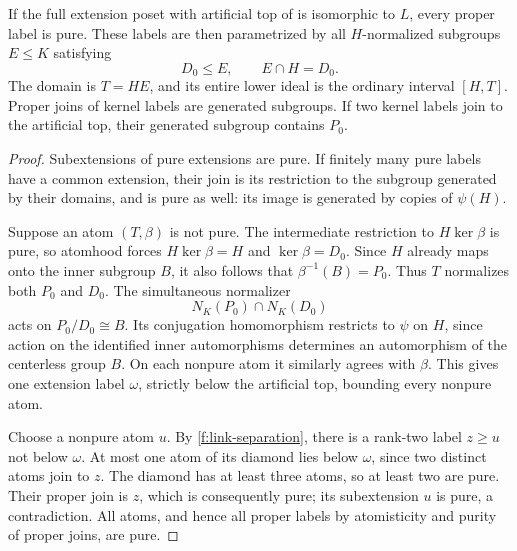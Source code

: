 \begin{lemma}\label{f:lem-purity}
If the full extension poset with artificial top of
 is isomorphic to $L$, every proper label is pure.
These labels are then parametrized by all $H$-normalized subgroups $E\le K$
satisfying
\begin{equation}\label{f:eq-pure-kernel}
 D_0\le E,\qquad E\cap H=D_0.
\end{equation}
The domain is $T=HE$, and its entire lower ideal is the ordinary interval
$[H,T]$. Proper joins of kernel labels are generated subgroups. If two
kernel labels join to the artificial top, their generated subgroup
contains $P_0$.
\end{lemma}
\begin{proof}
Subextensions of pure extensions are pure. If finitely many pure labels
have a common extension, their join is its restriction to the subgroup
generated by their domains, and is pure as well: its image is generated
by copies of $\psi(H)$.

Suppose an atom $(T,\beta)$ is not pure. The intermediate restriction to
$H\ker\beta$ is pure, so atomhood forces $H\ker\beta=H$ and
$\ker\beta=D_0$. Since $H$ already maps onto the inner subgroup $B$, it
also follows that $\beta^{-1}(B)=P_0$. Thus $T$ normalizes both $P_0$ and
$D_0$. The simultaneous normalizer
\[
 N_K(P_0)\cap N_K(D_0)
\]
acts on $P_0/D_0\cong B$. Its conjugation homomorphism restricts to $\psi$
on $H$, since action on the identified inner automorphisms determines an
automorphism of the centerless group $B$. On each nonpure atom it similarly
agrees with $\beta$. This gives one extension label $\omega$, strictly below
the artificial top, bounding every nonpure atom.

Choose a nonpure atom $u$. By
\ref{f:link-separation}, there is a rank-two
label $z\ge u$ not below $\omega$. At most one atom of its diamond lies
below $\omega$, since two distinct atoms join to $z$. The diamond has at
least three atoms, so at least two are pure. Their proper join is $z$,
which is consequently pure; its subextension $u$ is pure, a contradiction.
All atoms, and hence all proper labels by atomisticity and purity of proper
joins, are pure.


\end{proof}
